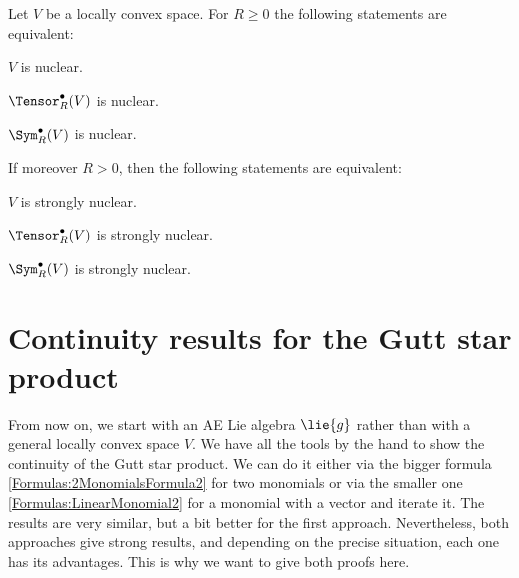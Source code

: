 \begin{proposition}[Nuclearity]
	\label{LCAna:Nuclearity}
	Let $V$ be a locally convex space. For $R \geq 0$ the following statements 
	are equivalent:
	\begin{propositionlist}
	  \item
		$V$ is nuclear.
	  \item
	  	$\Tensor_R^{\bullet}(V)$ is nuclear.
	  \item
	  	$\Sym_R^{\bullet}(V)$ is nuclear.	  	
	\end{propositionlist}
	If moreover $R > 0$, then the following statements are equivalent:
	\begin{propositionlist}
	  \item
		$V$ is strongly nuclear.
	  \item
	  	$\Tensor_R^{\bullet}(V)$ is strongly nuclear.
	  \item
	  	$\Sym_R^{\bullet}(V)$ is strongly nuclear.
	\end{propositionlist}
\end{proposition}




\section{Continuity results for the Gutt star product}
\label{sec:chap5_TopologyStar}

From now on, we start with an AE Lie algebra $\lie{g}$ rather than with a 
general locally convex space $V$. We have all the tools by the hand to show the 
continuity of the Gutt star product. We can do it either via the bigger 
formula \eqref{Formulas:2MonomialsFormula2} for two monomials or via the 
smaller one \eqref{Formulas:LinearMonomial2} for a monomial with a 
vector and iterate it. The results are very similar, but a bit better for the 
first approach. Nevertheless, both approaches give strong results, and 
depending on the precise situation, each one has its advantages. This is why 
we want to give both proofs here.

